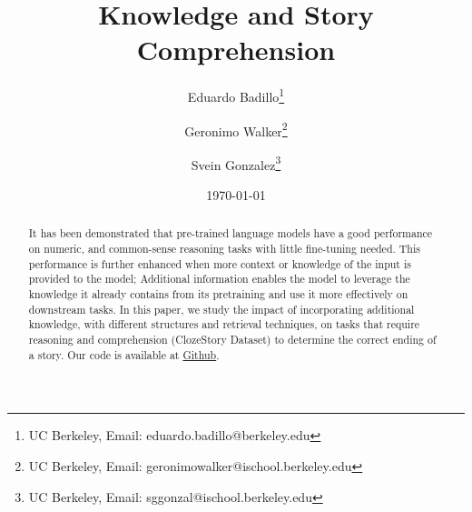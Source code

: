 \documentclass{article}
\title{Knowledge and Story Comprehension}
\author{Eduardo Badillo\thanks{UC Berkeley, Email: eduardo.badillo@berkeley.edu} \and Geronimo Walker\thanks{UC Berkeley, Email: 
geronimowalker@ischool.berkeley.edu} \and   Svein Gonzalez\thanks{UC Berkeley, Email: 
sggonzal@ischool.berkeley.edu}}
\date{\today}
\begin{document}
\maketitle

\begin{abstract}
\noindent %
It has been demonstrated that pre-trained language models have a good performance on numeric, and common-sense reasoning tasks with little fine-tuning needed. This performance is further enhanced when more context or knowledge of the input is provided to the model; Additional information enables the model to leverage the knowledge it already contains from its pretraining and use it more effectively on downstream tasks. In this paper, we study the impact of incorporating additional knowledge, with different structures and retrieval techniques, on tasks that require reasoning and comprehension (ClozeStory Dataset) to determine the correct ending of a story. Our code is available at \href{https://github.com/sveinerss/w266_project}{Github}.
\end{abstract}
\end{document}

